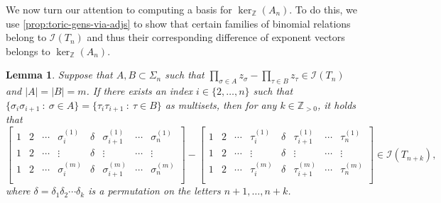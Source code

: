 \documentclass[12pt, reqno]{amsart}
\numberwithin{equation}{section}
\theoremstyle{plain}
\newtheorem{lemma}[theorem]{Lemma}
\theoremstyle{definition}
\newcommand{\zz}{\mathbb{Z}}
\newcommand{\ci}{\mathcal{I}}
\begin{document}
We now turn our attention to computing a basis for $\ker_\zz(A_n)$. To do this, we use \cref{prop:toric-gens-via-adjs} to show that certain families of binomial relations belong to $\ci(T_n)$ and thus their corresponding difference of exponent vectors belongs to $\ker_\zz(A_n)$. 

\begin{lemma}
\label{lemma:lift-binomials}
Suppose that $A, B \subset \Sigma_n$ such that $\prod\limits_{\sigma\in A} z_\sigma - \prod\limits_{\tau\in B} z_\tau \in \ci(T_n)$ and $|A| = |B| = m$. If there exists an index $i \in \{2,\ldots, n\}$ such that $\{\sigma_i \sigma_{i+1} ~:~ \sigma \in A \} = \{\tau_i \tau_{i+1} ~:~ \tau \in B \}$ as multisets, then for any $k \in \zz_{>0}$, it holds that
\begin{equation}
\label{eqn:lift-binomial}
\begin{bmatrix}
1 & 2 & \cdots & \sigma_i^{(1)} & \delta & \sigma_{i + 1}^{(1)} & \cdots & \sigma_n^{(1)} \\
1 & 2 & \cdots & \vdots         & \delta & \vdots               & \cdots & \vdots  \\
1 & 2 & \cdots & \sigma_i^{(m)} & \delta & \sigma_{i + 1}^{(m)} & \cdots & \sigma_n^{(m)} \\
\end{bmatrix} - 
\begin{bmatrix}
1 & 2 & \cdots & \tau_i^{(1)} & \delta & \tau_{i + 1}^{(1)} & \cdots & \tau_n^{(1)} \\
1 & 2 & \cdots & \vdots       & \delta & \vdots             & \cdots & \vdots  \\
1 & 2 & \cdots & \tau_i^{(m)} & \delta & \tau_{i + 1}^{(m)} & \cdots & \tau_n^{(m)} \\
\end{bmatrix} \in \ci(T_{n + k}), 
\end{equation}
where $\delta = \delta_1 \delta_2 \cdots \delta_k$ is a permutation on the letters $n+1, \ldots, n+k$.
\end{lemma}
\end{document}
